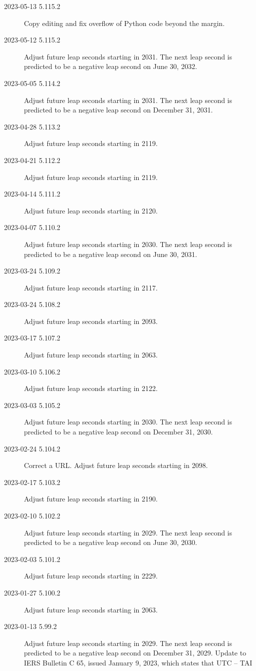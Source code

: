 \documentclass[letterpaper,twoside]{article}
\begin{document}
\begin{description}
\item[2023-05-13 5.115.2]Copy editing and fix overflow of Python code
  beyond the margin.
\item[2023-05-12 5.115.2]Adjust future leap seconds starting in 2031.
  The next leap second is predicted to be a negative leap second
  on June 30, 2032.
\item[2023-05-05 5.114.2]Adjust future leap seconds starting in 2031.
  The next leap second is predicted to be a negative leap second
  on December 31, 2031.
\item[2023-04-28 5.113.2]Adjust future leap seconds starting in 2119.
\item[2023-04-21 5.112.2]Adjust future leap seconds starting in 2119.
\item[2023-04-14 5.111.2]Adjust future leap seconds starting in 2120.
\item[2023-04-07 5.110.2]Adjust future leap seconds starting in 2030.
  The next leap second is predicted to be a negative leap second
  on June 30, 2031.
\item[2023-03-24 5.109.2]Adjust future leap seconds starting in 2117.
\item[2023-03-24 5.108.2]Adjust future leap seconds starting in 2093.
\item[2023-03-17 5.107.2]Adjust future leap seconds starting in 2063.
\item[2023-03-10 5.106.2]Adjust future leap seconds starting in 2122.
\item[2023-03-03 5.105.2]Adjust future leap seconds starting in 2030.
  The next leap second is predicted to be a negative leap second
  on December 31, 2030.
\item[2023-02-24 5.104.2]Correct a URL.  Adjust future leap seconds
  starting in 2098.
\item[2023-02-17 5.103.2]Adjust future leap seconds starting in 2190.
\item[2023-02-10 5.102.2]Adjust future leap seconds starting in 2029.
  The next leap second is predicted to be a negative leap second
  on June 30, 2030.
\item[2023-02-03 5.101.2]Adjust future leap seconds starting in 2229.
\item[2023-01-27 5.100.2]Adjust future leap seconds starting in 2063.
\item[2023-01-13 5.99.2]Adjust future leap seconds starting in 2029.
  The next leap second is predicted to be a negative leap second
  on December 31, 2029.
  Update to IERS Bulletin C 65,
  issued January 9, 2023, which states that UTC -- TAI

\end{description}
\end{document}
